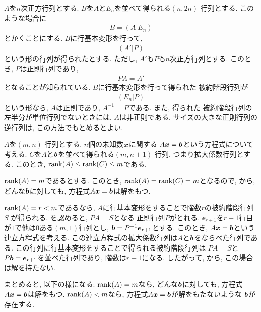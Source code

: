 \begin{remark}
  \label{thm:fund:inverse}
  \Provelater
  $A$を$n$次正方行列とする.
  $B$を$A$と$E_n$を並べて得られる$(n,2n)$-行列とする.
  このような場合に
  \begin{align*}
    B=(A|E_n)
  \end{align*}
  とかくことにする.
  $B$に行基本変形を行って,
  \begin{align*}
    (A'|P)
  \end{align*}
  という形の行列が得られたとする.
  ただし, $A'$も$P$も$n$次正方行列とする.
  このとき,
  $P$は正則行列であり,
  \begin{align*}
    PA=A'
  \end{align*}
  となることが知られている.
  $B$に行基本変形を行って得られた
  被約階段行列が
  \begin{align*}
    (E_n|P)
  \end{align*}
  という形なら,
  $A$は正則であり,
  $A^{-1}=P$である.
  また, 得られた
  被約階段行列の左半分が単位行列でないときには,
  $A$は非正則である.
  サイズの大きな正則行列の逆行列は,
  この方法でもとめるとよい.
\end{remark}

\begin{remark}
  \label{rem:syslineq:rank:gen}
  $A$を$(m,n)$-行列とする.
  $n$個の未知数$\boldsymbol{x}$に関する
  $A\boldsymbol{x}=\boldsymbol{b}$という方程式について考える.
  $C$を$A$と$\boldsymbol{b}$を並べて得られる$(m,n+1)$-行列,
  つまり拡大係数行列とする.
  このとき, $\operatorname{rank}(A)\leq \operatorname{rank}(C)\leq m$である.

  $\operatorname{rank}(A)=m$であるとする.
  このとき,
  $\operatorname{rank}(A)=\operatorname{rank}(C)=m$となるので,  
  から,
  どんな$\boldsymbol{b}$に対しても, 
  方程式$A\boldsymbol{x}=\boldsymbol{b}$は解をもつ.

  $\operatorname{rank}(A)=r<m$であるなら,
  $A$に行基本変形をすることで階数$r$の被約階段行列$S$
  が得られる.
  を認めると,
  $PA=S$となる
  正則行列$P$がとれる.
  $\ee_{r+1}$を$r+1$行目が$1$で他は$0$ある$(m,1)$行列とし,
  $\boldsymbol{b}=P^{-1}\boldsymbol{e}_{r+1}$とする.
  このとき,
  $A\boldsymbol{x}=\boldsymbol{b}$という連立方程式を考える.
  この連立方程式の拡大係数行列は$A$と$\boldsymbol{b}$をならべた行列である.
  この行列に行基本変形をすることで得られる被約階段行列は
  $PA=S$と
  $P\boldsymbol{b}=\boldsymbol{e}_{r+1}$を並べた行列であり,
  階数は$r+1$になる.  したがって,
  から,
  この場合は解を持たない.

  まとめると, 以下の様になる:
$\operatorname{rank}(A)=m$なら,
  どんな$\boldsymbol{b}$に対しても, 
  方程式$A\boldsymbol{x}=\boldsymbol{b}$は解をもつ.
$\operatorname{rank}(A)<m$なら,
  方程式$A\boldsymbol{x}=\boldsymbol{b}$が解をもたないような
  $\boldsymbol{b}$が存在する.
  
  
\end{remark}

